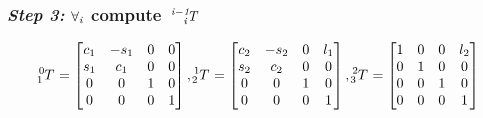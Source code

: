 \documentclass[10pt]{article}
\begin{document}
\subsubsection*{\textit{\textbf{Step 3: }}$\bf{\it{\forall_{i}}}$ compute $\bf{\it{ \tensor*[^{i-1}_{i}]{T}{}}}$}
\[
\tensor*[^{0}_{1}]{T}{} =
\begin{bmatrix}
    c_{1}        & -s_{1}       & 0     & 0      \\
    s_{1}        & c_{1}        & 0     & 0      \\
    0            & 0            & 1     & 0      \\
    0            & 0            & 0     & 1
\end{bmatrix}, 
\tensor*[^{1}_{2}]{T}{} =
\begin{bmatrix}
    c_{2}        & -s_{2}       & 0     & l_{1}      \\
    s_{2}        & c_{2}        & 0     & 0      \\
    0            & 0            & 1     & 0      \\
    0            & 0            & 0     & 1
\end{bmatrix}, 
\tensor*[^{2}_{3}]{T}{} =
\begin{bmatrix}
    1            & 0            & 0     & l_{2}  \\
    0            & 1            & 0     & 0      \\
    0            & 0            & 1     & 0      \\
    0            & 0            & 0     & 1
\end{bmatrix}\] \\
\end{document}
